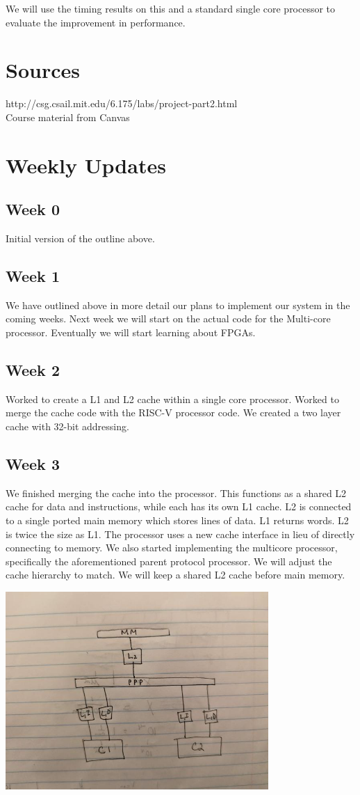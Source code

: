 \documentclass{article}
\begin{document}
We will use the timing results on this and a standard single core processor to evaluate the improvement in performance. 

\section{Sources}

http://csg.csail.mit.edu/6.175/labs/project-part2.html
\\
Course material from Canvas

\section{Weekly Updates}
\subsection{Week 0}
Initial version of the outline above.
\subsection{Week 1}
We have outlined above in more detail our plans to implement our system in the coming weeks. Next week we will start on the actual code for the Multi-core processor. Eventually we will start learning about FPGAs.
\subsection{Week 2}
Worked to create a L1 and L2 cache within a single core processor. Worked to merge the cache code with the RISC-V processor code. We created a two layer cache with 32-bit addressing.
\subsection{Week 3}
We finished merging the cache into the processor. This functions as a shared L2 cache for data and instructions, while each has its own L1 cache. L2 is connected to a single ported main memory which stores lines of data. L1 returns words. L2 is twice the size as L1. The processor uses a new cache interface in lieu of directly connecting to memory. We also started implementing the multicore processor, specifically the aforementioned parent protocol processor. We will adjust the cache hierarchy to match. We will keep a shared L2 cache before main memory. 

\includegraphics[width=10cm]{ppp.jpg}
\end{document}
